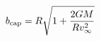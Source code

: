\documentclass[preview]{standalone}
\begin{document}
\begin{align*}
b_{\rm cap} = R\sqrt{1 + \frac{2GM}{Rv_\infty^2}}
\end{align*}
\end{document}
